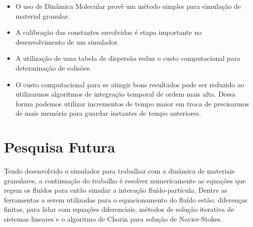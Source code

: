 \documentclass[a0,portrait]{a0poster}
\begin{document}
\begin{multicols}{2}
\begin{itemize}
\item O uso de Dinâmica Molecular provê um método simples para simulação de
material granular.
\item A calibração das constantes envolvidas é etapa importante no
desenvolvimento de um simulador.
\item A utilização de uma tabela de dispersão reduz o custo computacional para
determinação de colisões.
\item O custo computacional para se atingir bons resultados pode ser reduzido
ao utilizarmos algoritmos de integração temporal de ordem mais alta. Dessa
forma podemos utilizar incrementos de tempo maior em troca de precisarmos de
mais memória para guardar instantes de tempo anteriores.
\end{itemize}

\color{DarkSlateGray} %


\section*{Pesquisa Futura}
\paragraph{} Tendo desenvolvido o simulador para trabalhar com a dinâmica de
materiais granulares, a continuação do trabalho é resolver numericamente as
equações que regem os fluídos para então simular a interação fluído-partícula.
Dentre as ferramentas a serem utilizadas para o equacionamento do fluído estão:
diferenças finitas, para lidar com equações diferenciais, métodos de solução
iterativa de sistemas lineares e o algoritmo de Chorin para solução de
Navier-Stokes. 



\end{multicols}
\end{document}
